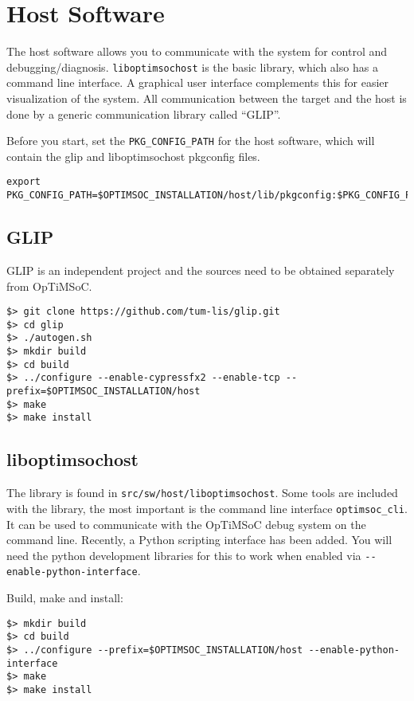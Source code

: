 \section{Host Software}

The host software allows you to communicate with the system for
control and debugging/diagnosis. \verb|liboptimsochost| is the basic
library, which also has a command line interface. A graphical user
interface complements this for easier visualization of the system. All
communication between the target and the host is done by a generic communication
library called ``GLIP''.

Before you start, set the \verb|PKG_CONFIG_PATH| for the host software, which
will contain the glip and liboptimsochost pkgconfig files.

\begin{verbatim}
export PKG_CONFIG_PATH=$OPTIMSOC_INSTALLATION/host/lib/pkgconfig:$PKG_CONFIG_PATH
\end{verbatim}

\subsection{GLIP}

GLIP is an independent project and the sources need to be obtained separately
from OpTiMSoC.

\begin{verbatim}
$> git clone https://github.com/tum-lis/glip.git
$> cd glip
$> ./autogen.sh
$> mkdir build
$> cd build
$> ../configure --enable-cypressfx2 --enable-tcp --prefix=$OPTIMSOC_INSTALLATION/host
$> make
$> make install
\end{verbatim}


\subsection{liboptimsochost}

The library is found in \verb|src/sw/host/liboptimsochost|.  Some
tools are included with the library, the most important is the command
line interface \verb|optimsoc_cli|. It can be used to communicate with
the OpTiMSoC debug system on the command line. Recently, a Python
scripting interface has been added. You will need the python
development libraries for this to work when enabled via
\verb|--enable-python-interface|.

Build, make and install:

\begin{verbatim}
$> mkdir build
$> cd build
$> ../configure --prefix=$OPTIMSOC_INSTALLATION/host --enable-python-interface
$> make
$> make install
\end{verbatim}

